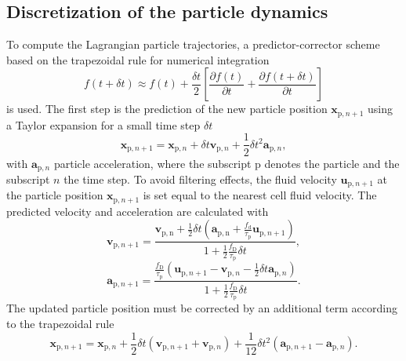 \documentclass[11pt,a4paper,openany,oneside,parskip=half*]{article}
\renewcommand*\vec[1]{\boldsymbol{#1}}
\begin{document}
\subsection{Discretization of the particle dynamics}
To compute the Lagrangian particle trajectories, a predictor-corrector scheme based on the trapezoidal rule for numerical integration
\begin{equation}
f (t + \delta t) \approx f(t) + \frac{\delta t}{2} \left[ \frac{\partial f(t)}{\partial t} + \frac{\partial f(t + \delta t)}{\partial t} \right ]
\end{equation}
is used.
\newline
The first step is the prediction of the new particle position $\vec{x}_{\mathrm{p}, n+1}$ using a Taylor expansion for a small time step $\delta t$
\begin{equation}
\vec{x}_{\mathrm{p}, n+1} = \vec{x}_{\mathrm{p}, n} + \delta t \vec{v}_{\mathrm{p}, n} + \frac{1}{2} \delta t^2 \vec{a}_{\mathrm{p}, n},
\end{equation}
with $\vec{a}_{\mathrm{p}, n}$ particle acceleration, where the subscript $\mathrm{p}$ denotes the particle and the subscript $n$ the time step.
\newline
To avoid filtering effects, the fluid velocity $\vec{u}_{\mathrm{p}, n+1}$ at the particle position $\vec{x}_{\mathrm{p}, n+1}$ is set equal to the nearest cell fluid velocity. 
\newline
The predicted velocity and acceleration are calculated with
\begin{equation}
\vec{v}_{\mathrm{p}, n+1} = \frac{\vec{v}_\mathrm{p,n} + \frac{1}{2} \delta t \left(\vec{a}_{\mathrm{p, n}} + \frac{f_\mathrm{d}}{\tau_\mathrm{p}}\vec{u}_{\mathrm{p}, n+1} \right)}{1 + \frac{1}{2} \frac{f_\mathrm{D}}{\tau_\mathrm{p}} \delta t},
\end{equation}
\begin{equation}
\vec{a}_{\mathrm{p}, n+1} = \frac{\frac{f_\mathrm{D}}{\tau_\mathrm{p}} \left(\vec{u}_{\mathrm{p}, n+1} - \vec{v}_{\mathrm{p}, n} - \frac{1}{2} \delta t \vec{a}_{\mathrm{p}, n} \right)}{1 + \frac{1}{2} \frac{f_\mathrm{D}}{\tau_\mathrm{p}} \delta t}.
\end{equation}
The updated particle position must be corrected by an additional term according to the trapezoidal rule
\begin{equation}
\vec{x}_{\mathrm{p}, n+1} = \vec{x}_{\mathrm{p}, n} + \frac{1}{2} \delta t \left( \vec{v}_{\mathrm{p}, n+1} + \vec{v}_{\mathrm{p}, n} \right) + \frac{1}{12} \delta t^2 \left( \vec{a}_{\mathrm{p}, n+1} - \vec{a}_{\mathrm{p}, n} \right).
\end{equation}
\end{document}
